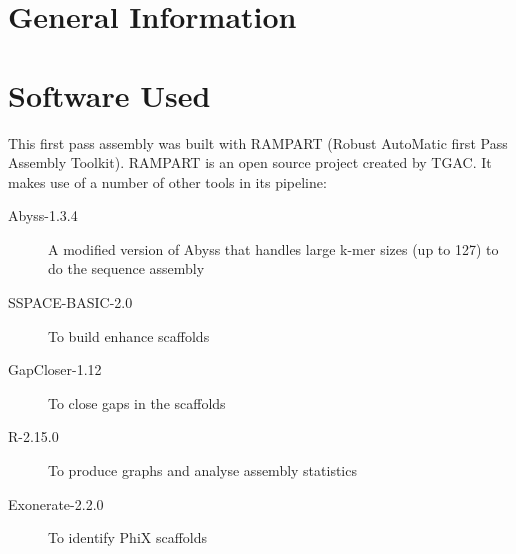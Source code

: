 \documentclass{amsart}
\title{\titleinfo}
\author{$job.author}
\date{}
\newcommand{\titleinfo}{$job.title}
\begin{document}
\maketitle
\thispagestyle{fancy}
\tableofcontents


\linespread{1.2} %
\setlength\parindent{0pt} %
\setlength{\parskip}{0.25cm} %
\setlength{\belowbottomsep}{2ex} %



\newpage
\section{General Information}


\section{Software Used}

This first pass assembly was built with RAMPART (Robust AutoMatic first Pass Assembly Toolkit).  RAMPART is an open source project created by TGAC.  It makes use of a number of other tools in its pipeline:

\begin{description}

\item[Abyss-1.3.4] A modified version of Abyss that handles large k-mer sizes (up to 127) to do the sequence assembly
\item[SSPACE-BASIC-2.0] To build enhance scaffolds
\item[GapCloser-1.12] To close gaps in the scaffolds
\item[R-2.15.0] To produce graphs and analyse assembly statistics
\item[Exonerate-2.2.0] To identify PhiX scaffolds
\end{description}
\end{document}

